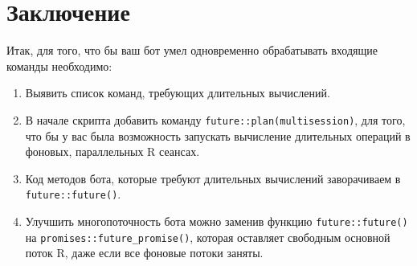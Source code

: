\documentclass[
]{book}
\newenvironment{Shaded}{\begin{snugshade}}{\end{snugshade}}
\newcommand{\AttributeTok}[1]{\textcolor[rgb]{0.13,0.29,0.53}{#1}}
\newcommand{\CommentTok}[1]{\textcolor[rgb]{0.56,0.35,0.01}{\textit{#1}}}
\newcommand{\FunctionTok}[1]{\textcolor[rgb]{0.13,0.29,0.53}{\textbf{#1}}}
\newcommand{\NormalTok}[1]{#1}
\newcommand{\OtherTok}[1]{\textcolor[rgb]{0.56,0.35,0.01}{#1}}
\newcommand{\SpecialCharTok}[1]{\textcolor[rgb]{0.81,0.36,0.00}{\textbf{#1}}}
\newcommand{\StringTok}[1]{\textcolor[rgb]{0.31,0.60,0.02}{#1}}
\providecommand{\tightlist}{%
  \setlength{\itemsep}{0pt}\setlength{\parskip}{0pt}}
\begin{document}
\begin{Shaded}
\end{Shaded}

\section{Заключение}\label{ux437ux430ux43aux43bux44eux447ux435ux43dux438ux435-6}

Итак, для того, что бы ваш бот умел одновременно обрабатывать входящие команды необходимо:

\begin{enumerate}
\def\labelenumi{\arabic{enumi}.}
\tightlist
\item
  Выявить список команд, требующих длительных вычислений.
\item
  В начале скрипта добавить команду \texttt{future::plan(\textquotesingle{}multisession\textquotesingle{})}, для того, что бы у вас была возможность запускать вычисление длительных операций в фоновых, параллельных R сеансах.
\item
  Код методов бота, которые требуют длительных вычислений заворачиваем в \texttt{future::future()}.
\item
  Улучшить многопоточность бота можно заменив функцию \texttt{future::future()} на \texttt{promises::future\_promise()}, которая оставляет свободным основной поток R, даже если все фоновые потоки заняты.
\end{enumerate}
\end{document}
